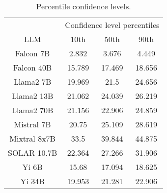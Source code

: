 \begin{table*}
\centering
\begin{tabular}{c|c|c|c}
& \multicolumn{3}{c}{Confidence level percentiles} \\ 
LLM & 10th & 50th & 90th\\ \hline
Falcon 7B & 2.832 & 3.676 & 4.449\\
Falcon 40B & 15.789 & 17.469 & 18.656\\
Llama2 7B & 19.969 & 21.5 & 24.656\\
Llama2 13B & 21.062 & 24.039 & 26.219\\
Llama2 70B & 21.156 & 22.906 & 24.859\\
Mistral 7B & 20.75 & 25.109 & 28.619\\
Mixtral 8x7B & 33.5 & 39.844 & 44.875\\
SOLAR 10.7B & 22.364 & 27.266 & 31.906\\
Yi 6B & 15.68 & 17.094 & 18.625\\
Yi 34B & 19.953 & 21.281 & 22.906\\
\hline
\end{tabular}
\caption{Percentile confidence levels.}
\label{tab:percentile_conf}
\end{table*}
